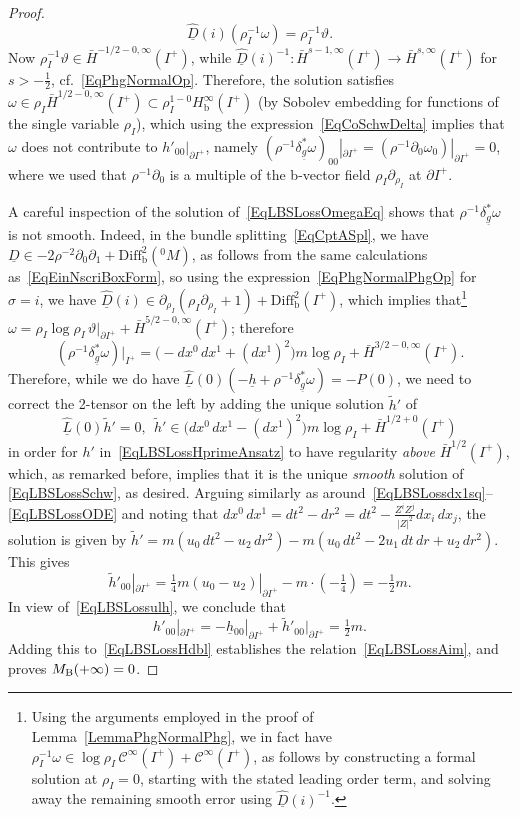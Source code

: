 \documentclass[reqno,11pt,letterpaper]{amsart}
\numberwithin{equation}{section}
\numberwithin{figure}{section}
\theoremstyle{definition}
\theoremstyle{remark}
\newcommand{\mc}{\mathcal}
\newcommand{\cC}{\mc C}
\newcommand{\pa}{\partial}
\newcommand{\ul}[1]{\underline{#1}{}}
\newcommand{\wh}{\widehat}
\newcommand{\wt}{\widetilde}
\newcommand{\bop}{{\mathrm{b}}}
\newcommand{\Diff}{\mathrm{Diff}}
\newcommand{\Diffb}{\Diff_\bop}
\newcommand{\half}{\tfrac{1}{2}}
\newcommand{\CI}{\cC^\infty}
\newcommand{\Hb}{H_{\bop}}
\newcommand{\Hext}{\bar H}
\begin{document}
\begin{proof}
  \begin{equation}
  \label{EqLBSLossOmegaEq}
    \wh{\ul D}(i)(\rho_I^{-1}\omega) = \rho_I^{-1}\vartheta.
  \end{equation}
  Now $\rho_I^{-1}\vartheta\in\Hext^{-1/2-0,\infty}(I^+)$, while $\wh{\ul D}(i)^{-1}\colon\Hext^{s-1,\infty}(I^+)\to\Hext^{s,\infty}(I^+)$ for $s>-\half$, cf.\ \eqref{EqPhgNormalOp}. Therefore, the solution satisfies $\omega\in\rho_I\Hext^{1/2-0,\infty}(I^+)\subset\rho_I^{1-0}\Hb^\infty(I^+)$ (by Sobolev embedding for functions of the single variable $\rho_I$), which using the expression~\eqref{EqCoSchwDelta} implies that $\omega$ does not contribute to $h'_{0 0}|_{\pa I^+}$, namely $(\rho^{-1}\delta_{\ul g}^*\omega)_{0 0}|_{\pa I^+} = (\rho^{-1}\pa_0\omega_0)|_{\pa I^+}=0$, where we used that $\rho^{-1}\pa_0$ is a multiple of the b-vector field $\rho_I\pa_{\rho_I}$ at $\pa I^+$.

  A careful inspection of the solution of~\eqref{EqLBSLossOmegaEq} shows that $\rho^{-1}\delta_{\ul g}^*\omega$ is not smooth. Indeed, in the bundle splitting~\eqref{EqCptASpl}, we have $\ul D\in-2\rho^{-2}\pa_0\pa_1+\Diffb^2({}^0\!M)$, as follows from the same calculations as~\eqref{EqEinNscriBoxForm}, so using the expression~\eqref{EqPhgNormalPhgOp} for $\sigma=i$, we have $\wh{\ul D}(i)\in\pa_{\rho_I}(\rho_I\pa_{\rho_I}+1)+\Diffb^2(I^+)$, which implies that\footnote{Using the arguments employed in the proof of Lemma~\ref{LemmaPhgNormalPhg}, we in fact have $\rho_I^{-1}\omega\in\log\rho_I\,\CI(I^+)+\CI(I^+)$, as follows by constructing a formal solution at $\rho_I=0$, starting with the stated leading order term, and solving away the remaining smooth error using $\wh{\ul D}(i)^{-1}$.} $\omega=\rho_I\log\rho_I\,\vartheta|_{\pa I^+}+\Hext^{5/2-0,\infty}(I^+)$; therefore
  \[
    (\rho^{-1}\delta_{\ul g}^*\omega)|_{I^+} = \bigl(-d x^0\,d x^1+(d x^1)^2\bigr)m \log\rho_I + \Hext^{3/2-0,\infty}(I^+).
  \]
  Therefore, while we do have $\wh{\ul L}(0)(-\ul h+\rho^{-1}\delta_{\ul g}^*\omega)=-P(0)$, we need to correct the 2-tensor on the left by adding the unique solution $\wt h'$ of
  \[
    \wh{\ul L}(0)\wt h'=0,\ \ \wt h' \in \bigl(d x^0\,d x^1-(d x^1)^2\bigr)m\log\rho_I + \Hext^{1/2+0}(I^+)
  \]
  in order for $h'$ in~\eqref{EqLBSLossHprimeAnsatz} to have regularity \emph{above} $\Hext^{1/2}(I^+)$, which, as remarked before, implies that it is the unique \emph{smooth} solution of \eqref{EqLBSLossSchw}, as desired. Arguing similarly as around~\eqref{EqLBSLossdx1sq}--\eqref{EqLBSLossODE} and noting that $d x^0\,d x^1=d t^2-d r^2=d t^2-\frac{Z^i Z^j}{|Z|^2}d x_i\,d x_j$, the solution is given by $\wt h'=m(u_0\,d t^2-u_2\,d r^2)-m(u_0\,d t^2-2 u_1\,d t\,d r+u_2\,d r^2)$. This gives
  \[
    \wt h'_{0 0}|_{\pa I^+} = \tfrac14 m (u_0-u_2)|_{\pa I^+} - m\cdot(-\tfrac14) = -\half m.
  \]
  In view of~\eqref{EqLBSLossulh}, we conclude that
  \[
    h'_{0 0}|_{\pa I^+} = -\ul h_{0 0}|_{\pa I^+} + \wt h'_{0 0}|_{\pa I^+} = \half m.
  \]
  Adding this to~\eqref{EqLBSLossHdbl} establishes the relation~\eqref{EqLBSLossAim}, and proves $M_{\rm B}(+\infty)=0$.
\end{proof}
\end{document}
